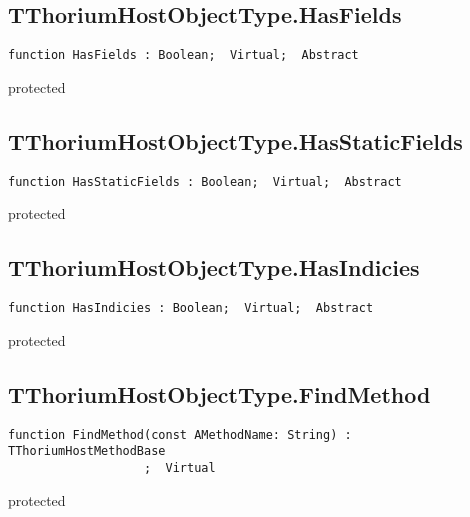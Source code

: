 \subsection{TThoriumHostObjectType.HasFields}
\label{thoriumcore:thorium:tthoriumhostobjecttype:hasfields}
\begin{FPCList}
\Synopsis
\Declaration 

\begin{verbatim}
function HasFields : Boolean;  Virtual;  Abstract
\end{verbatim}
\Visibility
protected
\Description
\Errors
\end{FPCList}
\subsection{TThoriumHostObjectType.HasStaticFields}
\label{thoriumcore:thorium:tthoriumhostobjecttype:hasstaticfields}
\begin{FPCList}
\Synopsis
\Declaration 

\begin{verbatim}
function HasStaticFields : Boolean;  Virtual;  Abstract
\end{verbatim}
\Visibility
protected
\Description
\Errors
\end{FPCList}
\subsection{TThoriumHostObjectType.HasIndicies}
\label{thoriumcore:thorium:tthoriumhostobjecttype:hasindicies}
\begin{FPCList}
\Synopsis
\Declaration 

\begin{verbatim}
function HasIndicies : Boolean;  Virtual;  Abstract
\end{verbatim}
\Visibility
protected
\Description
\Errors
\end{FPCList}
\subsection{TThoriumHostObjectType.FindMethod}
\label{thoriumcore:thorium:tthoriumhostobjecttype:findmethod}
\begin{FPCList}
\Synopsis
\Declaration 

\begin{verbatim}
function FindMethod(const AMethodName: String) : TThoriumHostMethodBase
                   ;  Virtual
\end{verbatim}
\Visibility
protected
\Description
\Errors
\end{FPCList}
